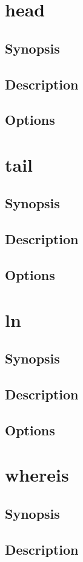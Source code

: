 \documentclass[a4paper, 10pt, onecolumn, openright, oneside]{book}
\begin{document}
		\section{head}
			\subsection{Synopsis}
			\subsection{Description}
			\subsection{Options}
		\section{tail}
			\subsection{Synopsis}
			\subsection{Description}
			\subsection{Options}
		\section{ln}
			\subsection{Synopsis}
			\subsection{Description}
			\subsection{Options}
		\section{whereis}
			\subsection{Synopsis}
			\subsection{Description}
\end{document}
